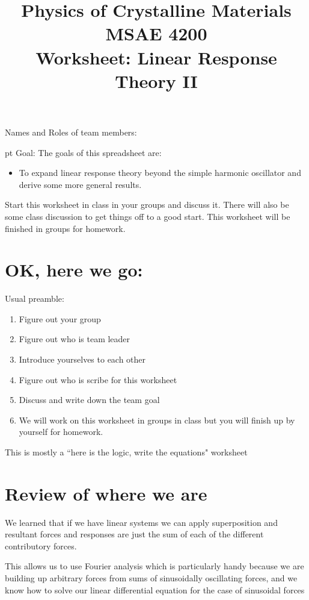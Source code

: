 \documentclass[]{revtex4}
\begin{document}
\title{Physics of Crystalline Materials\\
      MSAE 4200\\
      Worksheet: Linear Response Theory II}

\maketitle

\vskip 24pt
      {Names and Roles of team members:}

 pt
Goal: The goals of this spreadsheet are:
\begin{itemize}
      \item To expand linear response theory beyond the simple harmonic oscillator and derive some more general results.
\end{itemize}

\cork{}
\vskip 12pt



Start this worksheet in class in your groups and discuss it.  There will also be some class discussion to get things off to a good start.  This worksheet will be finished in groups for  homework.

\section*{OK, here we go:}
Usual preamble:
\begin{enumerate}
      \item Figure out your group
      \item Figure out who is team leader
      \item Introduce yourselves to each other
      \item Figure out who is scribe for this worksheet
      \item Discuss and write down the team goal
      \item We will work on this worksheet in groups in class but you will finish up by yourself for homework.
\end{enumerate}

This is mostly a
``here is the logic, write the equations" worksheet

\section*{Review of where we are}
\bi
\item We learned that if we have linear systems we can apply superposition and resultant forces and responses are just the sum of each of the different
contributory forces.
\item This allows us to use Fourier analysis which is particularly handy because we are building up arbitrary forces from sums of sinusoidally oscillating forces,
and we know how to solve our linear differential equation for the case of sinusoidal forces
\ei
\end{document}
